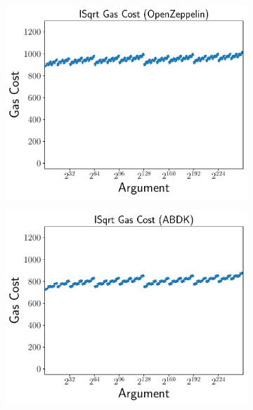 \begin{figure}[p]
    \begin{subfigure}[t]{0.45\textwidth}
    \includegraphics[width=\textwidth]{plots/plot_OpenZeppelin.pdf}
    \end{subfigure}
    \begin{subfigure}[t]{0.45\textwidth}
    \includegraphics[width=\textwidth]{plots/plot_ABDK.pdf}
    \end{subfigure}


\end{figure}
